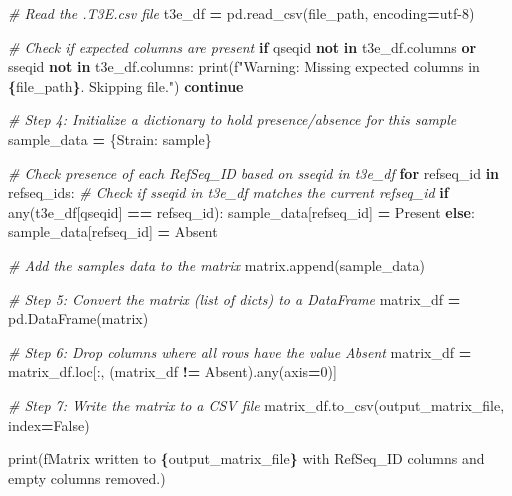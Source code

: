 \documentclass[
]{book}
\newenvironment{Shaded}{\begin{snugshade}}{\end{snugshade}}
\newcommand{\BuiltInTok}[1]{#1}
\newcommand{\CommentTok}[1]{\textcolor[rgb]{0.56,0.35,0.01}{\textit{#1}}}
\newcommand{\ControlFlowTok}[1]{\textcolor[rgb]{0.13,0.29,0.53}{\textbf{#1}}}
\newcommand{\DecValTok}[1]{\textcolor[rgb]{0.00,0.00,0.81}{#1}}
\newcommand{\KeywordTok}[1]{\textcolor[rgb]{0.13,0.29,0.53}{\textbf{#1}}}
\newcommand{\NormalTok}[1]{#1}
\newcommand{\OperatorTok}[1]{\textcolor[rgb]{0.81,0.36,0.00}{\textbf{#1}}}
\newcommand{\SpecialCharTok}[1]{\textcolor[rgb]{0.81,0.36,0.00}{\textbf{#1}}}
\newcommand{\SpecialStringTok}[1]{\textcolor[rgb]{0.31,0.60,0.02}{#1}}
\newcommand{\StringTok}[1]{\textcolor[rgb]{0.31,0.60,0.02}{#1}}
\newcommand{\VariableTok}[1]{\textcolor[rgb]{0.00,0.00,0.00}{#1}}
\begin{document}
\begin{Shaded}
\begin{Highlighting}[]
        \CommentTok{\# Read the .T3E.csv file}
\NormalTok{        t3e\_df }\OperatorTok{=}\NormalTok{ pd.read\_csv(file\_path, encoding}\OperatorTok{=}\StringTok{\textquotesingle{}utf{-}8\textquotesingle{}}\NormalTok{)}
        
        \CommentTok{\# Check if expected columns are present}
        \ControlFlowTok{if} \StringTok{\textquotesingle{}qseqid\textquotesingle{}} \KeywordTok{not} \KeywordTok{in}\NormalTok{ t3e\_df.columns }\KeywordTok{or} \StringTok{\textquotesingle{}sseqid\textquotesingle{}} \KeywordTok{not} \KeywordTok{in}\NormalTok{ t3e\_df.columns:}
            \BuiltInTok{print}\NormalTok{(}\SpecialStringTok{f"Warning: Missing expected columns in }\SpecialCharTok{\{}\NormalTok{file\_path}\SpecialCharTok{\}}\SpecialStringTok{. Skipping file."}\NormalTok{)}
            \ControlFlowTok{continue}
        
        \CommentTok{\# Step 4: Initialize a dictionary to hold presence/absence for this sample}
\NormalTok{        sample\_data }\OperatorTok{=}\NormalTok{ \{}\StringTok{\textquotesingle{}Strain\textquotesingle{}}\NormalTok{: sample\}}
        
        \CommentTok{\# Check presence of each RefSeq\_ID based on sseqid in t3e\_df}
        \ControlFlowTok{for}\NormalTok{ refseq\_id }\KeywordTok{in}\NormalTok{ refseq\_ids:}
            \CommentTok{\# Check if sseqid in t3e\_df matches the current refseq\_id}
            \ControlFlowTok{if} \BuiltInTok{any}\NormalTok{(t3e\_df[}\StringTok{\textquotesingle{}qseqid\textquotesingle{}}\NormalTok{] }\OperatorTok{==}\NormalTok{ refseq\_id):}
\NormalTok{                sample\_data[refseq\_id] }\OperatorTok{=} \StringTok{\textquotesingle{}Present\textquotesingle{}}
            \ControlFlowTok{else}\NormalTok{:}
\NormalTok{                sample\_data[refseq\_id] }\OperatorTok{=} \StringTok{\textquotesingle{}Absent\textquotesingle{}}
        
        \CommentTok{\# Add the sample\textquotesingle{}s data to the matrix}
\NormalTok{        matrix.append(sample\_data)}

\CommentTok{\# Step 5: Convert the matrix (list of dicts) to a DataFrame}
\NormalTok{matrix\_df }\OperatorTok{=}\NormalTok{ pd.DataFrame(matrix)}

\CommentTok{\# Step 6: Drop columns where all rows have the value \textquotesingle{}Absent\textquotesingle{}}
\NormalTok{matrix\_df }\OperatorTok{=}\NormalTok{ matrix\_df.loc[:, (matrix\_df }\OperatorTok{!=} \StringTok{\textquotesingle{}Absent\textquotesingle{}}\NormalTok{).}\BuiltInTok{any}\NormalTok{(axis}\OperatorTok{=}\DecValTok{0}\NormalTok{)]}

\CommentTok{\# Step 7: Write the matrix to a CSV file}
\NormalTok{matrix\_df.to\_csv(output\_matrix\_file, index}\OperatorTok{=}\VariableTok{False}\NormalTok{)}

\BuiltInTok{print}\NormalTok{(}\SpecialStringTok{f\textquotesingle{}Matrix written to }\SpecialCharTok{\{}\NormalTok{output\_matrix\_file}\SpecialCharTok{\}}\SpecialStringTok{ with RefSeq\_ID columns and empty columns removed.\textquotesingle{}}\NormalTok{)}
\end{Highlighting}
\end{Shaded}


  
\end{document}
